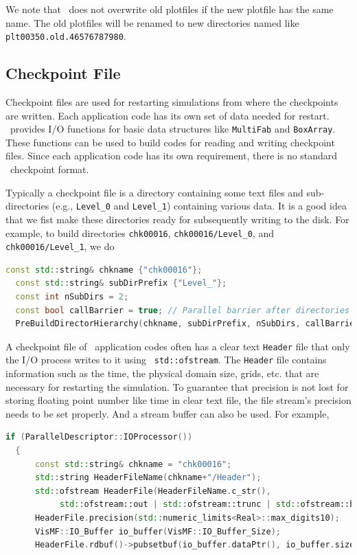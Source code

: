 {{We note that \amrex\ does not overwrite old plotfiles if the new
plotfile has the same name.  The old plotfiles will be renamed to
new directories named like {\tt plt00350.old.46576787980}.

\subsection{Checkpoint File}

Checkpoint files are used for restarting simulations from where the
checkpoints are written.  Each application code has its own set of
data needed for restart.  \amrex\ provides I/O functions for basic
data structures like {\tt MultiFab} and {\tt BoxArray}.  These
functions can be used to build codes for reading and writing
checkpoint files.  Since each application code has its own
requirement, there is no standard \amrex\ checkpoint format.

Typically a checkpoint file is a directory containing some text files
and sub-directories (e.g., {\tt Level\_0} and {\tt Level\_1})
containing various data.  It is a good idea that we fist make these
directories ready for subsequently writing to the disk.  For example,
to build directories {\tt chk00016}, {\tt chk00016/Level\_0}, and {\tt
  chk00016/Level\_1}, we do
\begin{lstlisting}[language=cpp]
  const std::string& chkname {"chk00016"};
  const std::string& subDirPrefix {"Level_"};
  const int nSubDirs = 2;
  const bool callBarrier = true; // Parallel barrier after directories are built.
  PreBuildDirectorHierarchy(chkname, subDirPrefix, nSubDirs, callBarrier);
\end{lstlisting}

A checkpoint file of \amrex\ application codes often has a clear text
{\tt Header} file that only the I/O process writes to it using {\tt
std::ofstream}.  The {\tt Header} file contains information such as
the time, the physical domain size, grids, etc. that are necessary for
restarting the simulation.  To guarantee that precision is not lost
for storing floating point number like time in clear text file, the
file stream's precision needs to be set properly.  And a stream buffer
can also be used.  For example,
\begin{lstlisting}[language=cpp]
  if (ParallelDescriptor::IOProcessor())
  {
      const std::string& chkname = "chk00016";
      std::string HeaderFileName(chkname+"/Header");
      std::ofstream HeaderFile(HeaderFileName.c_str(),
           std::ofstream::out | std::ofstream::trunc | std::ofstream::binary);
      HeaderFile.precision(std::numeric_limits<Real>::max_digits10);
      VisMF::IO_Buffer io_buffer(VisMF::IO_Buffer_Size);
      HeaderFile.rdbuf()->pubsetbuf(io_buffer.dataPtr(), io_buffer.size());


\end{lstlisting}}}
